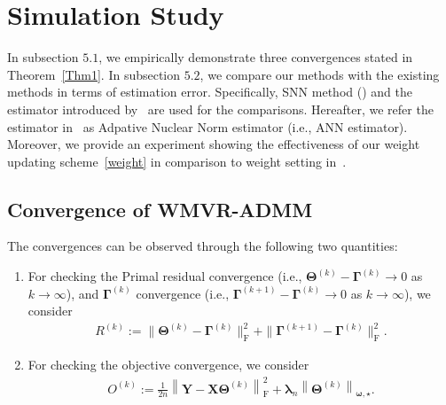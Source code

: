 \documentclass[alpha-refs]{wiley-article}
\begin{document}
\section{Simulation Study} \label{SC5}
In subsection $5.1$, we empirically demonstrate three convergences stated in Theorem~\ref{Thm1}.
In subsection $5.2$, we compare our methods with the existing methods in terms of estimation error.
Specifically, SNN method (\citet{yuan2007dimension}) and the estimator introduced by~\citet{chen2013reduced} are used for the comparisons. 
Hereafter, we refer the estimator in~\citet{chen2013reduced} as Adpative Nuclear Norm estimator (i.e., ANN estimator).
Moreover, we provide an experiment showing the effectiveness of our weight updating scheme~\eqref{weight} in comparison to weight setting in~\citet{chen2013reduced}.

\subsection{Convergence of WMVR-ADMM}
The convergences can be observed through the following two quantities:
\begin{enumerate}
    \item For checking the Primal residual convergence (i.e., $\boldsymbol{\Theta}^{(k)}-\boldsymbol{\Gamma}^{(k)}\rightarrow{0}$ as $k\rightarrow{\infty}$), 
    and $\boldsymbol{\Gamma}^{(k)}$ convergence (i.e., $\boldsymbol{\Gamma}^{(k+1)}-\boldsymbol{\Gamma}^{(k)}\rightarrow{0}$ as $k\rightarrow{\infty}$), we consider
    \begin{align*}
        R^{(k)} := \| \boldsymbol{\Theta}^{(k)}-\boldsymbol{\Gamma}^{(k)} \|_{\text{F}}^{2} + 
        \| \boldsymbol{\Gamma}^{(k+1)}-\boldsymbol{\Gamma}^{(k)} \|_{\text{F}}^{2}.
    \end{align*}
    \item For checking the objective convergence, we consider
    \begin{align*}
        O^{(k)} :=  \frac{1}{2n} \left\| \boldsymbol{Y}-\boldsymbol{X}\boldsymbol{\Theta}^{(k)} \right\|_{\text{F}}^{2} + \boldsymbol{\lambda}_{n} \left\| \boldsymbol{\Theta}^{(k)}\right\|_{\boldsymbol{\omega,\star}} .
    \end{align*}
\end{enumerate}

\end{document}
